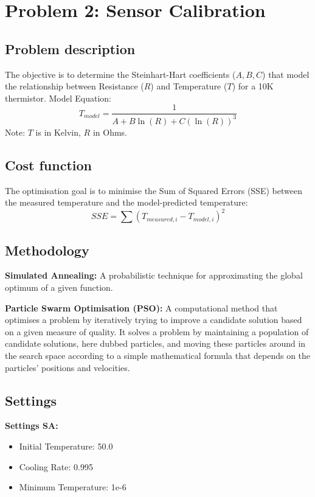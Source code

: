 \section{Problem 2: Sensor Calibration}

\subsection{Problem description}
The objective is to determine the Steinhart-Hart coefficients ($A, B, C$) that model the relationship between Resistance ($R$) and Temperature ($T$) for a 10K thermistor.
Model Equation:
\begin{equation}
T_{model} = \frac{1}{A + B \ln(R) + C (\ln(R))^3}
\end{equation}
Note: $T$ is in Kelvin, $R$ in Ohms.

\subsection{Cost function}
The optimisation goal is to minimise the Sum of Squared Errors (SSE) between the measured temperature and the model-predicted temperature:
\begin{equation}
SSE = \sum (T_{measured,i} - T_{model,i})^2
\end{equation}

\subsection{Methodology}
\textbf{Simulated Annealing:}
A probabilistic technique for approximating the global optimum of a given function.

\textbf{Particle Swarm Optimisation (PSO):}
A computational method that optimises a problem by iteratively trying to improve a candidate solution based on a given measure of quality. It solves a problem by maintaining a population of candidate solutions, here dubbed particles, and moving these particles around in the search space according to a simple mathematical formula that depends on the particles' positions and velocities.

\subsection{Settings}

\textbf{Settings SA:}
\begin{itemize}
    \item Initial Temperature: 50.0
    \item Cooling Rate: 0.995
    \item Minimum Temperature: 1e-6
\end{itemize}

